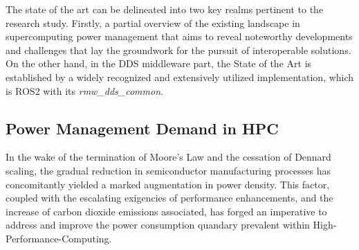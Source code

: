 

The state of the art can be delineated into two key realms pertinent to the research study. Firstly, a partial overview of the existing landscape in supercomputing power management that aims to reveal noteworthy developments and challenges that lay the groundwork for the pursuit of interoperable solutions. On the other hand, in the DDS middleware part, the State of the Art is established by a widely recognized and extensively utilized implementation, which is ROS2 with its \emph{rmw\_dds\_common}.

\subsection{Power Management Demand in HPC}
In the wake of the termination of Moore's Law and the cessation of Dennard scaling, the gradual reduction in semiconductor manufacturing processes has concomitantly yielded a marked augmentation in power density\cite{MOSFET-Scaling}. This factor, coupled with the escalating exigencies of performance enhancements, and the increase of carbon dioxide emissions associated, has forged an imperative to address and improve the power consumption quandary prevalent within High-Performance-Computing.

